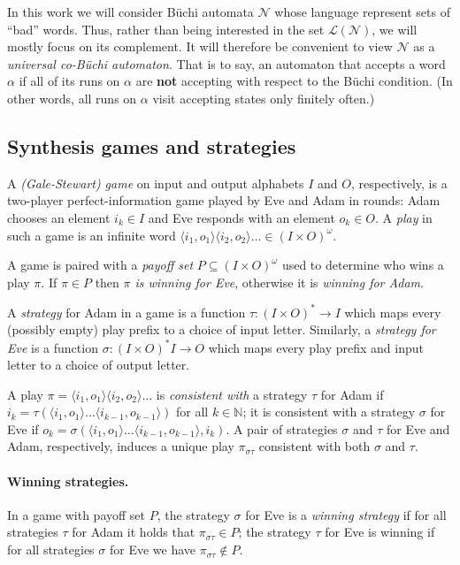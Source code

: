 \documentclass[runningheads,a4paper,draft]{llncs}
\newcommand{\eve}{Eve\xspace}
\newcommand{\adam}{Adam\xspace}
\newcommand{\calN}{\mathcal{N}}
\newcommand{\lang}[1]{\mathcal{L}({#1})}
\newcommand{\out}[2]{\pi_{#1#2}}
\begin{document}
In this work we will consider B\"uchi automata $\calN$ whose
language represent sets of ``bad'' words. Thus, rather than being interested in
the set $\lang{\calN}$, we will mostly focus on its complement. It will
therefore be convenient to view $\calN$ as a \emph{universal
co-B\"uchi automaton}. That is to say, an automaton that accepts a word $\alpha$
if all of its runs on $\alpha$ are \textbf{not} accepting with respect to the
B\"uchi condition. (In other words, all runs on $\alpha$ visit accepting states
only finitely often.)

\subsection{Synthesis games and strategies}
\begin{definition}[Games]
  A \emph{(Gale-Stewart) game} on input and output alphabets $I$ and $O$,
  respectively, is a two-player perfect-information game played by \eve and
  \adam in rounds: \adam chooses an element $i_k \in I$ and \eve responds with
  an element $o_k \in O$. A \emph{play} in such a game is an infinite word
  $\langle i_1, o_1\rangle \langle i_2, o_2\rangle \dots \in (I\times O)^\omega$. 
\end{definition}
A game is paired with a \emph{payoff set} $P \subseteq (I \times
O)^\omega$ used to determine who wins a play $\pi$. If $\pi \in P$ then
\emph{$\pi$ is winning for \eve}, otherwise it is \emph{winning for \adam}.

\begin{definition}[Strategies]
  A \emph{strategy} for \adam in a game is a function $\tau : (I \times O)^*
  \to I$ which maps every (possibly empty) play prefix
  to a choice of input letter.  Similarly, a \emph{strategy for \eve}
  is a function $\sigma : (I \times O)^* I \to O$ which maps every play prefix
  and input letter to a choice of output letter.
\end{definition}
A play $\pi = \langle i_1, o_1\rangle \langle i_2, o_2\rangle \dots$ is
\emph{consistent with} a strategy $\tau$ for \adam if $i_k = \tau( \langle
i_1, o_1\rangle \dots \langle i_{k-1}, o_{k-1}\rangle)$ for all $k \in
\mathbb{N}$; it is consistent with a strategy $\sigma$ for \eve if $o_k =
\sigma( \langle i_1, o_1\rangle \dots \langle i_{k-1}, o_{k-1}\rangle,
i_{k})$.  A pair of strategies $\sigma$ and $\tau$ for \eve and \adam,
respectively, induces a unique play $\out{\sigma}{\tau}$ consistent with both
$\sigma$ and $\tau$.

\paragraph*{Winning strategies.}
In a game with payoff set $P$, the strategy $\sigma$ for \eve is a \emph{winning
strategy} if for all strategies $\tau$ for \adam it holds that
$\out{\sigma}{\tau} \in P$; the strategy $\tau$ for \eve is winning if for all
strategies $\sigma$ for \eve we have $\out{\sigma}{\tau} \not\in P$.
\end{document}
